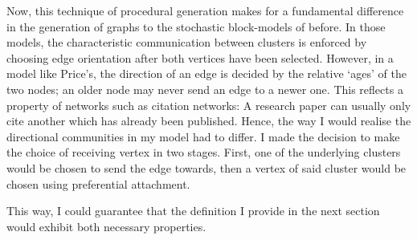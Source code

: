 Now, this technique of procedural generation makes for a fundamental difference in the generation
of graphs to the stochastic block-models of before. In those models, the characteristic 
communication between clusters is enforced by choosing edge orientation after both vertices have 
been selected. However, in a model like Price's, the direction of an edge is decided by the 
relative `ages' of the two nodes; an older node may never send an edge to a newer one. This 
reflects a property of networks such as citation networks: A research paper can usually only cite 
another which has already been published. Hence, the way I would realise the directional 
communities in my model had to differ. I made the decision to make the choice of receiving 
vertex in two stages. First, one of the underlying clusters would be chosen to send the edge 
towards, then a vertex of said cluster would be chosen using preferential attachment.

This way, I could guarantee that the definition I provide in the next section would exhibit both 
necessary properties.

